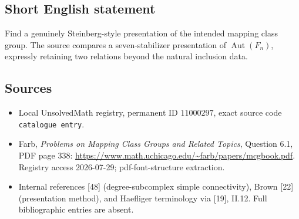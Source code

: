 \documentclass[11pt]{article}
\begin{document}
\subsection{Short English statement}
Find a genuinely Steinberg-style presentation of the intended mapping class group. The source compares a seven-stabilizer presentation of \(\operatorname{Aut}(F_n)\), expressly retaining two relations beyond the natural inclusion data.
\subsection{Sources}
\begin{itemize}
\item Local UnsolvedMath registry, permanent ID \(11000297\), exact source code \texttt{catalogue entry}.
\item Farb, \emph{Problems on Mapping Class Groups and Related Topics}, Question 6.1, PDF page 338: \url{https://www.math.uchicago.edu/~farb/papers/mcgbook.pdf}. Registry access 2026-07-29; pdf-font-structure extraction.
\item Internal references [48] (degree-subcomplex simple connectivity), Brown [22] (presentation method), and Haefliger terminology via [19], II.12. Full bibliographic entries are absent.
\end{itemize}
\end{document}
